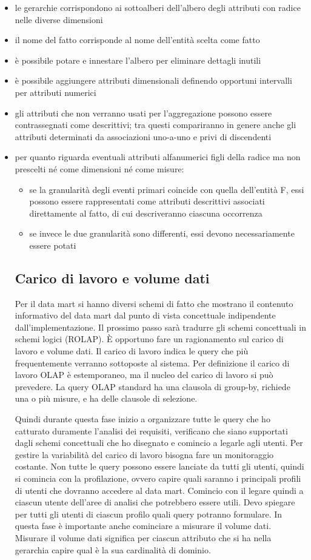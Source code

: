 \begin{itemize}
	\item 
	le gerarchie corrispondono ai sottoalberi dell’albero degli attributi con radice nelle diverse dimensioni
	\item 
	il nome del fatto corrisponde al nome dell’entità scelta come fatto
	\item 
	è possibile potare e innestare l’albero per eliminare dettagli inutili
	\item 
	è possibile aggiungere attributi dimensionali definendo opportuni intervalli per attributi numerici
	\item 
	gli attributi che non verranno usati per l’aggregazione possono essere contrassegnati come descrittivi; tra questi compariranno in genere anche gli attributi determinati da associazioni uno-a-uno e privi di discendenti
	\item 
	per quanto riguarda eventuali attributi alfanumerici figli della radice ma non prescelti né come dimensioni né come misure:
	\begin{itemize}
		\item 
		se la granularità degli eventi primari coincide con quella dell’entità F, essi possono essere rappresentati come attributi descrittivi associati direttamente al fatto, di cui descriveranno ciascuna occorrenza
		\item 
		se invece le due granularità sono differenti, essi devono necessariamente essere potati
	\end{itemize}
\subsection{Carico di lavoro e volume dati}
Per il data mart si hanno diversi schemi di fatto che mostrano il contenuto informativo del data mart dal punto di vista concettuale indipendente dall’implementazione. Il prossimo passo sarà tradurre gli schemi concettuali in schemi logici (ROLAP). È opportuno fare un ragionamento sul carico di lavoro e volume dati. Il carico di lavoro indica le query che più frequentemente verranno sottoposte al sistema. Per definizione il carico di lavoro OLAP è estemporaneo, ma il nucleo del carico di lavoro si può prevedere. La query OLAP standard ha una clausola di group-by, richiede una o più misure, e ha delle clausole di selezione. 

Quindi durante questa fase inizio a organizzare tutte le query che ho catturato duramente l’analisi dei requisiti, verificano che siano supportati dagli schemi concettuali che ho disegnato e comincio a legarle agli utenti. Per gestire la variabilità del carico di lavoro bisogna fare un monitoraggio costante. Non tutte le query possono essere lanciate da tutti gli utenti, quindi si comincia con la profilazione, ovvero capire quali saranno i principali profili di utenti che dovranno accedere al data mart. Comincio con il legare quindi a ciascun utente dell’aree di analisi che potrebbero essere utili. Devo spiegare per tutti gli utenti di ciascun profilo quali query potranno formulare. In questa fase è importante anche cominciare a misurare il volume dati. Misurare il volume dati significa per ciascun attributo che si ha nella gerarchia capire qual è la sua cardinalità di dominio. 

\end{itemize}

